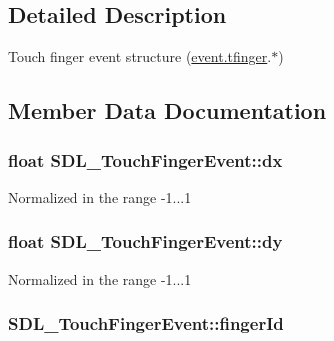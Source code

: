 \subsection{Detailed Description}
Touch finger event structure (\hyperlink{union_s_d_l___event_ab18d7d60794cb056948ffa58541bc3c5}{event.\+tfinger}.$\ast$) 

\subsection{Member Data Documentation}
\subsubsection[{\texorpdfstring{dx}{dx}}]{\setlength{\rightskip}{0pt plus 5cm}float S\+D\+L\+\_\+\+Touch\+Finger\+Event\+::dx}\hypertarget{struct_s_d_l___touch_finger_event_ac6acac209d6e2bd659fdb6760081393d}{}\label{struct_s_d_l___touch_finger_event_ac6acac209d6e2bd659fdb6760081393d}
Normalized in the range -\/1...1 
\subsubsection[{\texorpdfstring{dy}{dy}}]{\setlength{\rightskip}{0pt plus 5cm}float S\+D\+L\+\_\+\+Touch\+Finger\+Event\+::dy}\hypertarget{struct_s_d_l___touch_finger_event_a9c0320c5f18a6b9d10da657e166608c9}{}\label{struct_s_d_l___touch_finger_event_a9c0320c5f18a6b9d10da657e166608c9}
Normalized in the range -\/1...1 
\subsubsection[{\texorpdfstring{finger\+Id}{fingerId}}]{ S\+D\+L\+\_\+\+Touch\+Finger\+Event\+::finger\+Id}\hypertarget{struct_s_d_l___touch_finger_event_a8616d46ed19906e3ee90a4d481d3a284}{}\label{struct_s_d_l___touch_finger_event_a8616d46ed19906e3ee90a4d481d3a284}
